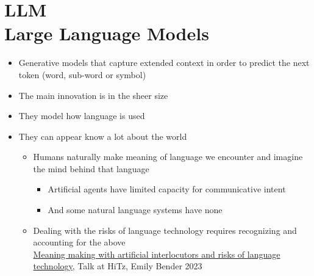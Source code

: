 \documentclass[25pt,a4paper,landscape,headrule,footrule,xetex]{foils}
\begin{document}


\maketitle
\makexeCJKinactive

%


\section{LLM\\ Large Language Models}



\begin{itemize}
\item Generative models that capture extended context in order to
  predict the next token (word, sub-word or symbol) 
\item The main innovation is in the sheer size
\item They model how language is used
\item They can appear know a lot about the world
  \begin{itemize}
  \item Humans naturally make meaning of language we encounter and     imagine the mind behind that language
     \begin{itemize}
  \item Artificial agents have limited capacity for communicative intent
  \item And some natural language systems have none
  \end{itemize}
\item Dealing with the risks of language
    technology requires recognizing and accounting for the above
 \\   \href{https://faculty.washington.edu/ebender/papers/Bender-HiTZ-2023.pdf}{Meaning
      making with artificial interlocutors and risks of language
      technology}, Talk at HiTz, Emily Bender 2023
  \end{itemize}
\end{itemize}

\end{document}
